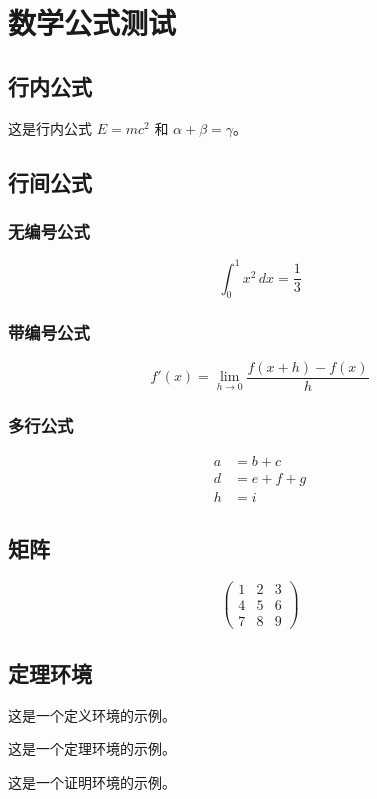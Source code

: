 \documentclass{sduthesis}
\begin{document}
\chapter{数学公式测试}

\section{行内公式}

这是行内公式 $E = mc^2$ 和 $\alpha + \beta = \gamma$。

\section{行间公式}

\subsection{无编号公式}

\[
\int_0^1 x^2 \, dx = \frac{1}{3}
\]

\subsection{带编号公式}

\begin{equation}
  \label{eq:derivative}
  f'(x) = \lim_{h \to 0} \frac{f(x+h) - f(x)}{h}
\end{equation}

\subsection{多行公式}

\begin{align}
  a &= b + c \label{eq:align1} \\
  d &= e + f + g \label{eq:align2} \\
  h &= i \label{eq:align3}
\end{align}

\section{矩阵}

\[
\begin{pmatrix}
  1 & 2 & 3 \\
  4 & 5 & 6 \\
  7 & 8 & 9
\end{pmatrix}
\]

\section{定理环境}

\begin{definition}
  这是一个定义环境的示例。
\end{definition}

\begin{Theorem}
  这是一个定理环境的示例。
\end{Theorem}

\begin{Proof}
  这是一个证明环境的示例。
\end{Proof}
\end{document}
